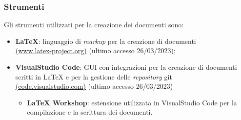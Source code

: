\subsubsection{Strumenti}
Gli strumenti utilizzati per la creazione dei documenti sono:
\begin{itemize}
	\item \textbf{LaTeX}: linguaggio di \textit{markup} per la creazione di
	      documenti \\
	      \href{https://www.latex-project.org/}{(www.latex-project.org)} (ultimo accesso 26/03/2023);
	\item \textbf{VisualStudio Code}: GUI con integrazioni per la creazione di
	      documenti scritti in LaTeX e per la gestione delle \textit{repository\g} git\g \\
	      \href{https://code.visualstudio.com/}{(code.visualstudio.com)} (ultimo accesso 26/03/2023)
	      \begin{itemize}
		      \item \textbf{LaTeX Workshop}: estensione utilizzata in
		            VisualStudio Code per la compilazione e la scrittura dei
		            documenti.
	      \end{itemize}
\end{itemize}
